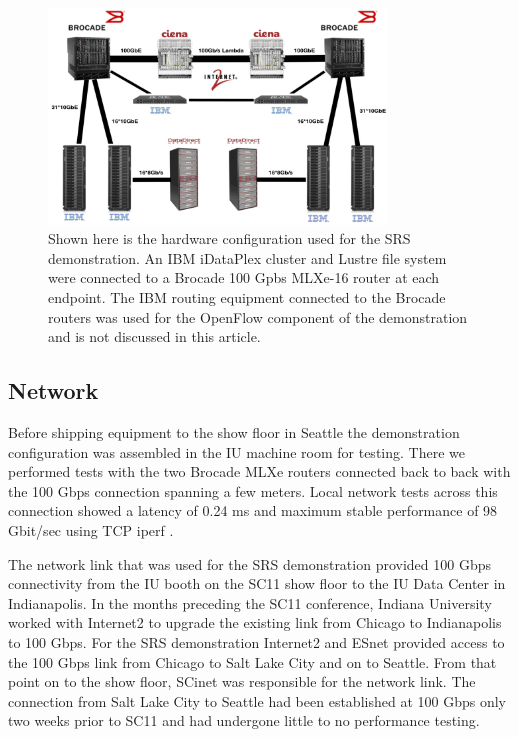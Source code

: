 \documentclass[]{sigplan-proc}
\begin{document}
\begin{figure}[t]
\begin{center}
\includegraphics[width=0.80\textwidth]{figures/hardware.png}
\caption{Shown here is the hardware configuration used for the SRS demonstration. An IBM iDataPlex cluster and
  Lustre file system were connected to a Brocade 100 Gpbs MLXe-16 router at each endpoint. The IBM routing
  equipment connected to the Brocade routers was used for the OpenFlow component of the demonstration and is
  not discussed in this article. }
\label{fig:hardwaresetup}
\end{center}
\end{figure}

\subsection{Network}

Before shipping equipment to the show floor in Seattle the demonstration configuration was assembled in the IU
machine room for testing.  There we performed tests with the two Brocade MLXe routers connected back to back
with the 100 Gbps connection spanning a few meters.  Local network tests across this connection showed a
latency of 0.24 ms and maximum stable performance of 98 Gbit/sec using TCP iperf \cite{iperf2012}.

The network link that was used for the SRS demonstration provided 100 Gbps connectivity from the IU booth on
the SC11 show floor to the IU Data Center in Indianapolis. In the months preceding the SC11 conference,
Indiana University worked with Internet2 to upgrade the existing link from Chicago to Indianapolis to 100
Gbps. For the SRS demonstration Internet2 and ESnet provided access to the 100 Gbps link from Chicago to Salt
Lake City and on to Seattle. From that point on to the show floor, SCinet was responsible for the network
link. The connection from Salt Lake City to Seattle had been established at 100 Gbps only two weeks prior to
SC11 and had undergone little to no performance testing.
\end{document}
